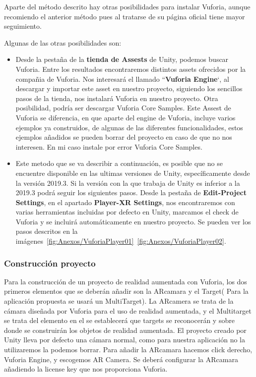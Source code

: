 Aparte del método descrito hay otras posibilidades para instalar Vuforia, aunque recomiendo el anterior método pues al tratarse de su página oficial tiene mayor seguimiento.

Algunas de las otras posibilidades son:
\begin{itemize}
	\item Desde la pestaña de la \textbf{tienda de Assests} de Unity, podemos buscar Vuforia. Entre los resultados encontraremos distintos assets ofrecidos por la compañia de Vuforia. Nos interesará el llamado ``\textbf{Vuforia Engine}`, al descargar y importar este asset en nuestro proyecto, siguiendo los sencillos pasos de la tienda, nos instalará Vuforia en nuestro proyecto.
	Otra posibilidad, podría ser descargar Vuforia Core Samples. Este Assest de Vuforia se diferencia, en que aparte del engine de Vuforia, incluye varios ejemplos ya construidos, de algunas de las diferentes funcionalidades, estos ejemplos añadidos se pueden borrar del proyecto en caso de que no nos interesen. En mi caso instale por error Vuforia Core Samples.
	
	\item Este metodo que se va describir a continuación, es posible que no se encuentre disponible en las ultimas versiones de Unity, específicamente desde la versión 2019.3. Si la versión con la que trabaja de Unity es inferior a la 2019.3 podrá seguir los siguientes pasos. Desde la pestaña de \textbf{Edit-Project Settings}, en el apartado \textbf{Player-XR Settings}, nos encontraremos con varias herramientas incluidas por defecto en Unity, marcamos el check de Vuforia y se incluirá automáticamente en nuestro proyecto. Se pueden ver los pasos descritos en la imágenes~\ref{fig:Anexos/VuforiaPlayer01}~\ref{fig:Anexos/VuforiaPlayer02}.
	
\end{itemize}



\subsubsection{Construcción proyecto}

Para la construcción de un proyecto de realidad aumentada con Vuforia, los dos primeros elementos que se deberán añadir son la ARcamara y el Target( Para la aplicación propuesta se usará un MultiTarget). La ARcamera se trata de la cámara diseñada por Vuforia para el uso de realidad aumentada, y el Multitarget se trata del elemento en el se establecerá que targets se reconocerán y sobre donde se construirán los objetos de realidad aumentada.
El proyecto creado por Unity lleva por defecto una cámara normal, como para nuestra aplicación no la utilizaremos la podemos borrar.
Para añadir la ARcamara hacemos click derecho, Vuforia Engine, y escogemos AR Camera. Se deberá configurar la ARcamara añadiendo la license key que nos proporciona Vuforia.

